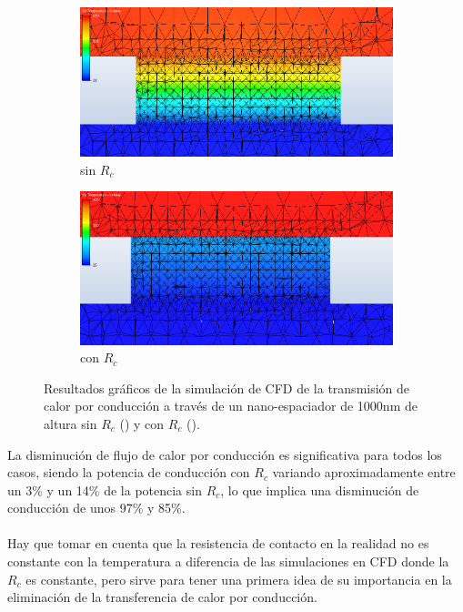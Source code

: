 \begin{figure}[H]
	\centering 		%
	\begin{subfigure}[b]{0.49\textwidth}
	\centering
		\includegraphics[width=1.00\textwidth]{SiSiO2Si_1000nm_Plane.png}
		\caption{sin $R_c$}
	\label{fig:Pcond_SiSiO2Si_CFD}
\end{subfigure}
\hfill 					%
\begin{subfigure}[b]{0.49\textwidth}
	\centering
		\includegraphics[width=1.00\textwidth]{SiSiO2Si_1000nm_Plane_Rc.png}
		\caption{con $R_c$}
	\label{fig:Pcond_SiSiO2Si_Rc_CFD}
\end{subfigure}
\caption{Resultados gráficos de la simulación de CFD de la transmisión de calor por conducción a través de un nano-espaciador de 1000nm de altura sin $R_c$ () y con $R_c$ ().}
	\label{fig:Pconds_SiSiO2Si_CFD}
\end{figure}
La disminución de flujo de calor por conducción es significativa para todos los casos, siendo la potencia de conducción con $R_c$ variando aproximadamente entre un 3\% y un 14\% de la potencia sin $R_c$, lo que implica una disminución de conducción de unos 97\% y 85\%.\\\\
Hay que tomar en cuenta que la resistencia de contacto en la realidad no es constante con la temperatura a diferencia de las simulaciones en CFD donde la $R_c$ es constante, pero sirve para tener una primera idea de su importancia en la eliminación de la transferencia de calor por conducción.
